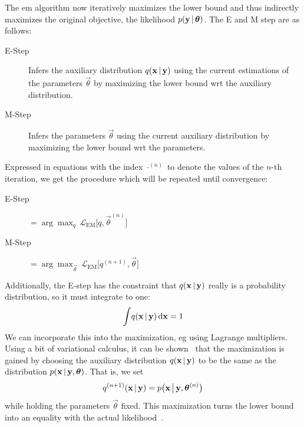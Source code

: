 		The \ac{em} algorithm now iteratively maximizes the lower bound and thus indirectly maximizes the original objective, the likelihood \( p(\boldsymbol{\mathrm{y}} \,\vert\, \boldsymbol{\mathrm{\theta}}) \). The E and M step are as follows:
		\begin{description}
			\item[E-Step] Infers the auxiliary distribution \( q(\boldsymbol{\mathrm{x}} \,\vert\, \boldsymbol{\mathrm{y}}) \) using the current estimations of the parameters \( \vec{\theta} \) by maximizing the lower bound \ac{wrt} the auxiliary distribution.
			\item[M-Step] Infers the parameters \(\vec{\theta}\) using the current auxiliary distribution by maximizing the lower bound \ac{wrt} the parameters.
		\end{description}
		Expressed in equations with the index \( \cdot^{(n)} \) to denote the values of the \(n\)-th iteration, we get the procedure which will be repeated until convergence:
		\begin{description}
			\item[E-Step]  \(\displaystyle = \arg\max_{q}\, \mathcal{L}_\mathrm{EM}\big[ q, \vec{\theta}^{(n)} \big] \)
			\item[M-Step]  \(\displaystyle = \arg\max_{\vec{\theta}}\, \mathcal{L}_\mathrm{EM}\big[ q^{(n + 1)}, \vec{\theta} \big] \)
		\end{description}
		Additionally, the E-step has the constraint that \(q(\boldsymbol{\mathrm{x}} \,\vert\, \boldsymbol{\mathrm{y}})\) really is a probability distribution, so it must integrate to one:
		\begin{align*}
			\int\! q(\boldsymbol{\mathrm{x}} \,\vert\, \boldsymbol{\mathrm{y}}) \dd{\boldsymbol{\mathrm{x}}} = 1
		\end{align*}
		We can incorporate this into the maximization, \ac{eg} using Lagrange multipliers. Using a bit of variational calculus, it can be shown~\cite{bealVariationalAlgorithmsApproximate2003} that the maximization is gained by choosing the auxiliary distribution \(q(\boldsymbol{\mathrm{x}} \,\vert\, \boldsymbol{\mathrm{y}})\) to be the same as the distribution \( p(\boldsymbol{\mathrm{x}} \,\vert\, \boldsymbol{\mathrm{y}}, \boldsymbol{\mathrm{\theta}}) \). That is, we set
		\begin{align*}
			q^{(n + 1)}(\boldsymbol{\mathrm{x}} \,\vert\, \boldsymbol{\mathrm{y}}) = p\big(\boldsymbol{\mathrm{x}} \,\big\vert\, \boldsymbol{\mathrm{y}}, \boldsymbol{\mathrm{\theta}}^{(n)}\big)
		\end{align*}
		while holding the parameters \(\vec{\theta}\) fixed. This maximization turns the lower bound into an equality with the actual likelihood~\cite{bealVariationalAlgorithmsApproximate2003}.

